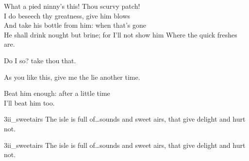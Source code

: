 
\begin{verse_speech}[Caliban] 
What a pied ninny's this! Thou scurvy patch!\\
I do beseech thy greatness, give him blows\\
And take his bottle from him: when that's gone\\
He shall drink nought but brine; for I'll not show him
Where the quick freshes are.
\end{verse_speech}





\begin{verse_speech}[Stephano] 
Do I so? take thou that.
	
	
As you like this, give me the lie another time.
\end{verse_speech}



	


\begin{verse_speech}[Caliban]
Beat him enough: after a little time\\
I'll beat him too.
\end{verse_speech}


\begin{pictures} %
	\begin{letter}
		\begin{colorbigpic}
			[1.1]
			{3ii_sweetairs}
			{The isle is full of\dots sounds and sweet airs, that give delight and hurt not.}
		\end{colorbigpic}
	\end{letter}
	\begin{a4}
		\begin{colorbigpic}
			[1]
			{3ii_sweetairs}
			{The isle is full of\dots sounds and sweet airs, that give delight and hurt not.}
		\end{colorbigpic}
	\end{a4}
\end{pictures}

